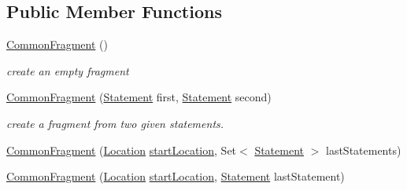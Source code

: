 \subsection*{Public Member Functions}
\begin{DoxyCompactItemize}
\item 
\hypertarget{classedu_1_1udel_1_1cis_1_1vsl_1_1civl_1_1model_1_1common_1_1CommonFragment_ac1b67e43bc0435ce82054a2d8e713901}{}\hyperlink{classedu_1_1udel_1_1cis_1_1vsl_1_1civl_1_1model_1_1common_1_1CommonFragment_ac1b67e43bc0435ce82054a2d8e713901}{Common\+Fragment} ()\label{classedu_1_1udel_1_1cis_1_1vsl_1_1civl_1_1model_1_1common_1_1CommonFragment_ac1b67e43bc0435ce82054a2d8e713901}

\begin{DoxyCompactList}\small\item\em create an empty fragment \end{DoxyCompactList}\item 
\hyperlink{classedu_1_1udel_1_1cis_1_1vsl_1_1civl_1_1model_1_1common_1_1CommonFragment_a6293efba110f98c5177707b0aa6f71ee}{Common\+Fragment} (\hyperlink{interfaceedu_1_1udel_1_1cis_1_1vsl_1_1civl_1_1model_1_1IF_1_1statement_1_1Statement}{Statement} first, \hyperlink{interfaceedu_1_1udel_1_1cis_1_1vsl_1_1civl_1_1model_1_1IF_1_1statement_1_1Statement}{Statement} second)
\begin{DoxyCompactList}\small\item\em create a fragment from two given statements. \end{DoxyCompactList}\item 
\hyperlink{classedu_1_1udel_1_1cis_1_1vsl_1_1civl_1_1model_1_1common_1_1CommonFragment_a6eceb9b9df138123ebc22b88f12f9f29}{Common\+Fragment} (\hyperlink{interfaceedu_1_1udel_1_1cis_1_1vsl_1_1civl_1_1model_1_1IF_1_1location_1_1Location}{Location} \hyperlink{classedu_1_1udel_1_1cis_1_1vsl_1_1civl_1_1model_1_1common_1_1CommonFragment_ad1d03c97ac98a41837fdacd82c3232f5}{start\+Location}, Set$<$ \hyperlink{interfaceedu_1_1udel_1_1cis_1_1vsl_1_1civl_1_1model_1_1IF_1_1statement_1_1Statement}{Statement} $>$ last\+Statements)
\item 
\hyperlink{classedu_1_1udel_1_1cis_1_1vsl_1_1civl_1_1model_1_1common_1_1CommonFragment_a25846b4230453599f6b0c8ea8bcbd52a}{Common\+Fragment} (\hyperlink{interfaceedu_1_1udel_1_1cis_1_1vsl_1_1civl_1_1model_1_1IF_1_1location_1_1Location}{Location} \hyperlink{classedu_1_1udel_1_1cis_1_1vsl_1_1civl_1_1model_1_1common_1_1CommonFragment_ad1d03c97ac98a41837fdacd82c3232f5}{start\+Location}, \hyperlink{interfaceedu_1_1udel_1_1cis_1_1vsl_1_1civl_1_1model_1_1IF_1_1statement_1_1Statement}{Statement} last\+Statement)

\end{DoxyCompactItemize}
